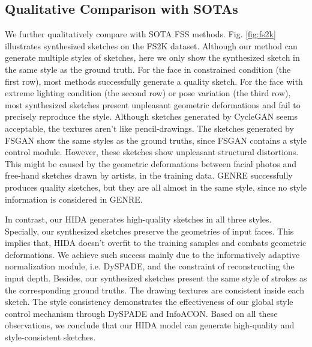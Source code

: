 \documentclass[10pt,twocolumn,letterpaper]{article}
\begin{document}
\subsection{Qualitative Comparison with SOTAs}
\label{ssec:exp_quali}

We further qualitatively compare with SOTA FSS methods. Fig. \ref{fig:fs2k} illustrates synthesized sketches on the FS2K dataset. Although our method can generate multiple styles of sketches, here we only show the synthesized sketch in the same style as the ground truth. 
For the face in constrained condition (the first row), most methods successfully generate a quality sketch. For the face with extreme lighting condition (the second row) or pose variation (the third row), most synthesized sketches present unpleasant geometric deformations and fail to precisely reproduce the style. 
Although sketches generated by CycleGAN seems acceptable, the textures aren't like pencil-drawings. 
The sketches generated by FSGAN show the same styles as the ground truths, since FSGAN contains a style control module. However, these sketches show unpleasant structural distortions. This might be caused by the geometric deformations between facial photos and free-hand sketches drawn by artists, in the training data. 
GENRE successfully produces quality sketches, but they are all almost in the same style, since no style information is considered in GENRE. 

In contrast, our HIDA generates high-quality sketches in all three styles. Specially, our synthesized sketches preserve the geometries of input faces. This implies that, HIDA doesn't overfit to the training samples and combats geometric deformations. We achieve such success mainly due to the informatively adaptive normalization module, i.e. DySPADE, and the constraint of reconstructing the input depth. 
Besides, our synthesized sketches present the same style of strokes as the corresponding ground truths. The drawing textures are consistent inside each sketch. The style consistency demonstrates the effectiveness of our global style control mechanism through DySPADE and InfoACON. Based on all these observations, we conclude that our HIDA model can generate high-quality and style-consistent sketches.    
	

\end{document}
